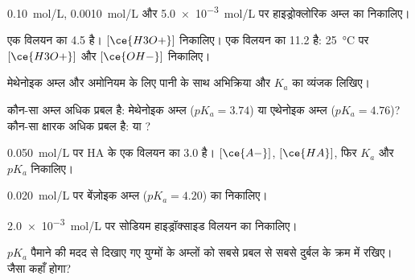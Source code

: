 \begin{exercise}[$\star$]\label{exo:g12:ka-and-pka:2}
\qty{0.10}{mol/L}, \qty{0.0010}{mol/L} और \qty{5.0e-3}{mol/L} पर
हाइड्रोक्लोरिक अम्ल का  निकालिए।
\end{exercise}

\begin{exercise}[$\star$]\label{exo:g12:ka-and-pka:3}
एक विलयन का  4.5 है। $[\ce{H3O+}]$ निकालिए। एक विलयन का  11.2 है:
\qty{25}{\celsius} पर $[\ce{H3O+}]$ और $[\ce{OH-}]$ निकालिए।
\end{exercise}

\begin{exercise}[$\star$]\label{exo:g12:ka-and-pka:4}
मेथेनोइक अम्ल और अमोनियम  के लिए पानी के साथ अभिक्रिया और $K_a$ का
व्यंजक लिखिए।
\end{exercise}

\begin{exercise}[$\star$]\label{exo:g12:ka-and-pka:5}
कौन-सा अम्ल अधिक प्रबल है: मेथेनोइक अम्ल ($pK_a = 3.74$) या एथेनोइक
अम्ल ($pK_a = 4.76$)? कौन-सा क्षारक अधिक प्रबल है:  या
?
\end{exercise}

\begin{exercise}[$\star\star$]\label{exo:g12:ka-and-pka:6}
\qty{0.050}{mol/L} पर  HA के एक विलयन का  3.0 है।
$[\ce{A-}]$, $[\ce{HA}]$, फिर $K_a$ और $pK_a$ निकालिए।
\end{exercise}

\begin{exercise}[$\star\star$]\label{exo:g12:ka-and-pka:7}
\qty{0.020}{mol/L} पर बेंज़ोइक अम्ल ($pK_a = 4.20$) का  निकालिए।
\end{exercise}

\begin{exercise}[$\star\star$]\label{exo:g12:ka-and-pka:8}
\qty{2.0e-3}{mol/L} पर सोडियम हाइड्रॉक्साइड विलयन का  निकालिए।
\end{exercise}

\begin{exercise}[$\star\star$]\label{exo:g12:ka-and-pka:9}
$pK_a$ पैमाने की मदद से दिखाए गए युग्मों के अम्लों को
सबसे प्रबल से सबसे दुर्बल के क्रम में रखिए।  जैसा  कहाँ
होगा?
\end{exercise}

